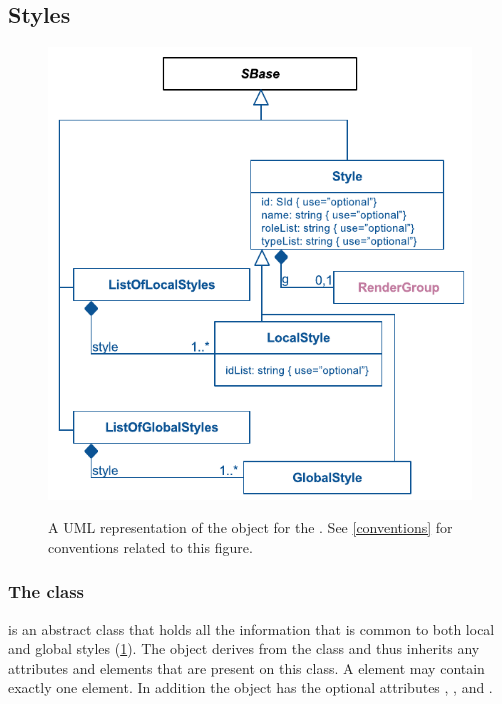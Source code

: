 \subsection{Styles}
\label{style-class}

\begin{figure}[h!]
  \centering
  \includegraphics[width=\textwidth]{images/render-style-uml}\\
  \caption{A UML representation of the \Style object for the \RenderPackage.
	See \ref{conventions} for conventions related to this figure. }
  \label{fig:style_render_uml}
\end{figure}
\subsubsection{The  class}
\label{style-class}

\Style is an abstract class that holds all the information that is common to both local and global styles (\ref{fig:style_render_uml}). The \Style object derives from the \SBase class and thus inherits any
attributes and elements that are present on this class.
A \Style element may contain exactly one \RenderGroup element.
In addition the \Style object has the optional attributes , ,  and .

